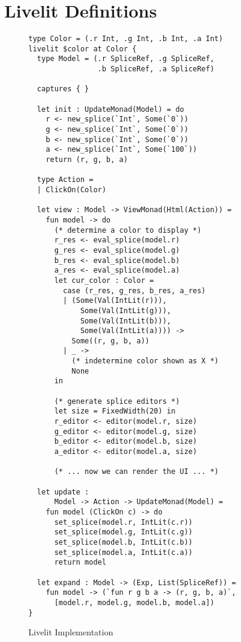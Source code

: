 \section{Livelit Definitions}\label{sec:livelit-definitions}

\begin{figure}
\begin{lstlisting}[xleftmargin=0.2cm]
type Color = (.r Int, .g Int, .b Int, .a Int)
livelit $color at Color {
  type Model = (.r SpliceRef, .g SpliceRef, 
                .b SpliceRef, .a SpliceRef)

  captures { }

  let init : UpdateMonad(Model) = do 
    r <- new_splice(`Int`, Some(`0`))
    g <- new_splice(`Int`, Some(`0`))
    b <- new_splice(`Int`, Some(`0`))
    a <- new_splice(`Int`, Some(`100`))
    return (r, g, b, a)

  type Action = 
  | ClickOn(Color)

  let view : Model -> ViewMonad(Html(Action)) = 
    fun model -> do 
      (* determine a color to display *)
      r_res <- eval_splice(model.r)
      g_res <- eval_splice(model.g)
      b_res <- eval_splice(model.b)
      a_res <- eval_splice(model.a)
      let cur_color : Color = 
        case (r_res, g_res, b_res, a_res) 
        | (Some(Val(IntLit(r))), 
            Some(Val(IntLit(g))), 
            Some(Val(IntLit(b))), 
            Some(Val(IntLit(a)))) -> 
          Some((r, g, b, a))
        | _ -> 
          (* indetermine color shown as X *)
          None 
      in 
      
      (* generate splice editors *)
      let size = FixedWidth(20) in 
      r_editor <- editor(model.r, size)
      g_editor <- editor(model.g, size)
      b_editor <- editor(model.b, size)
      a_editor <- editor(model.a, size)
      
      (* ... now we can render the UI ... *)
    
  let update : 
      Model -> Action -> UpdateMonad(Model) =
    fun model (ClickOn c) -> do 
      set_splice(model.r, IntLit(c.r))
      set_splice(model.g, IntLit(c.g))
      set_splice(model.b, IntLit(c.b))
      set_splice(model.a, IntLit(c.a))
      return model
  
  let expand : Model -> (Exp, List(SpliceRef)) = 
    fun model -> (`fun r g b a -> (r, g, b, a)`, 
      [model.r, model.g, model.b, model.a])
}
\end{lstlisting}
\vspace{-8px}
\caption{Livelit Implementation}
\label{fig:color-impl}
\end{figure}

